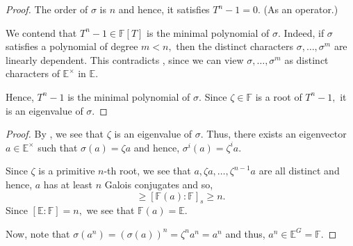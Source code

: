 \primeigenvalue*\label{lem:primeigenvalue2}
\begin{flushright}\hyperref[lem:primeigenvalue]{\upsym}\end{flushright}
\begin{proof}
    The order of $\sigma$ is $n$ and hence, it satisfies $T^n - 1 = 0.$ (As an operator.)

    We contend that $T^n - 1 \in \mathbb{F}[T]$ is the minimal polynomial of $\sigma.$ Indeed, if $\sigma$ satisfies a polynomial of degree $m < n,$ then the distinct characters $\sigma, \ldots, \sigma^m$ are linearly dependent. This contradicts , since we can view $\sigma, \ldots, \sigma^m$ as distinct characters of $\mathbb{E}^\times$ in $\mathbb{E}.$

    Hence, $T^n - 1$ is the minimal polynomial of $\sigma.$ Since $\zeta \in \mathbb{F}$ is a root of $T^n - 1,$ it is an eigenvalue of $\sigma.$
\end{proof}

\cyclicextprimroot*\label{thm:cyclicextprimroot2}
\begin{flushright}\hyperref[thm:cyclicextprimroot]{\upsym}\end{flushright}
\begin{proof}
    By , we see that $\zeta$ is an eigenvalue of $\sigma.$ Thus, there exists an eigenvector $a \in \mathbb{E}^\times$ such that $\sigma(a) = \zeta a$ and hence, $\sigma^i(a) = \zeta^i a.$

    Since $\zeta$ is a primitive $n$-th root, we see that $a, \zeta a, \ldots, \zeta^{n - 1}a$ are all distinct and hence, $a$ has at least $n$ Galois conjugates and so, 
    \begin{equation*} 
        [\mathbb{F}(a) : \mathbb{F}] \ge [\mathbb{F}(a) : \mathbb{F}]_s \ge n.
    \end{equation*}
    Since $[\mathbb{E} : \mathbb{F}] = n,$ we see that $\mathbb{F}(a) = \mathbb{E}.$ 

    Now, note that $\sigma(a^n) = (\sigma(a))^n = \zeta^na^n = a^n$ and thus, $a^n \in \mathbb{E}^G = \mathbb{F}.$
\end{proof}

